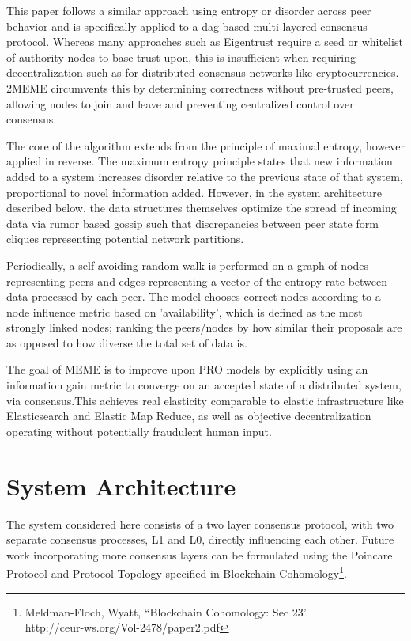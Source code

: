 \documentclass{article}
\begin{document}
This paper follows a similar approach using entropy or disorder across peer behavior and is specifically applied to a dag-based multi-layered consensus protocol. Whereas many approaches such as Eigentrust require a seed or whitelist of authority nodes to base trust upon, this is insufficient when requiring decentralization such as for distributed consensus networks like cryptocurrencies. 2MEME circumvents this by determining correctness without pre-trusted peers, allowing nodes to join and leave and preventing centralized control over consensus.

The core of the algorithm extends from the principle of maximal entropy, however applied in reverse. The maximum entropy principle states that new information added to a system increases disorder relative to the previous state of that system, proportional to novel information added. However, in the system architecture described below, the data structures themselves optimize the spread of incoming data via rumor based gossip such that discrepancies between peer state form cliques representing potential network partitions.

Periodically, a self avoiding random walk is performed on a graph of nodes representing peers and edges representing a vector of the entropy rate between data processed by each peer. The model chooses correct nodes according to a node influence metric based on 'availability', which is defined as the most strongly linked nodes; ranking the peers/nodes by how similar their proposals are as opposed to how diverse the total set of data is.

The goal of MEME is to improve upon PRO models by explicitly using an information gain metric to converge on an accepted state of a distributed system, via consensus.This achieves real elasticity comparable to elastic infrastructure like Elasticsearch and Elastic Map Reduce, as well as objective decentralization operating without potentially fraudulent human input.

\section{System Architecture}
The system considered here consists of a two layer consensus protocol, with two separate consensus processes, L1 and L0, directly influencing each other. Future work incorporating more consensus layers can be formulated using the Poincare Protocol and Protocol Topology specified in Blockchain Cohomology\footnote{Meldman-Floch, Wyatt, ``Blockchain Cohomology: Sec 23' \\ http://ceur-ws.org/Vol-2478/paper2.pdf}.
\end{document}
